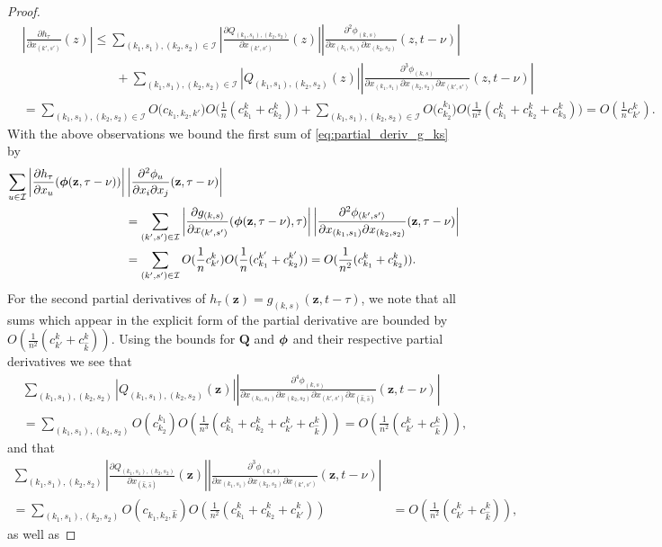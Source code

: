 \documentclass[acmsmall]{acmart}
\newcommand\bz{\mathbf{z}}
\newcommand\bphi{\text{\boldmath$\phi$}}
\newcommand\bQ{\mathbf{Q}}
\newcommand\calI{\mathcal{I}}
\newcommand\abs[1]{\left|#1\right|}         %
\newcommand{\dddd}[5]{ \frac{\partial^4 #1 }{ \partial x_{#2} \partial x_{#3} \partial x_{#4} \partial x_{#5} }}
\newcommand{\ddd}[4]{ \frac{\partial^3 #1 }{ \partial x_{#2} \partial x_{#3} \partial x_{#4} }}
\begin{document}
\begin{proof}
\begin{align*}
&\abs{\frac{\partial h_\tau}{\partial x_{(k',s')}}(z)} \leq \sum_{(k_1,s_1),(k_2,s_2) \in \calI} \abs{\frac{\partial Q_{(k_1,s_1),(k_2,s_2)}}{\partial x_{(k',s')}}(z)} \abs{\frac{\partial^2 \phi_{(k,s)}}{\partial x_{(k_1,s_1)} \partial x_{(k_2,s_2)}}(z,t-\nu)} \\
& \phantom{\frac{\partial h_\tau}{\partial x_{(k',s')}}(z) \leq} \quad + \sum_{(k_1,s_1),(k_2,s_2) \in \calI} \abs{Q_{(k_1,s_1),(k_2,s_2)}(z)} \abs{\frac{\partial^3 \phi_{(k,s)}}{\partial x_{(k_1,s_1)} \partial x_{(k_2,s_2)} \partial x_{(k',s')}}(z,t-\nu)} \\
& = \sum_{(k_1,s_1),(k_2,s_2) \in \calI} O\bigl(c_{k_1,k_2,k'}\bigr)O\bigl(\frac{1}{n}(c^k_{k_1}+c^k_{k_2})\bigr) + \sum_{(k_1,s_1),(k_2,s_2) \in \calI} O\bigl( c^{k_1}_{k_2} \bigr)O\bigl( \frac{1}{n^2} (c^{k}_{k_1} + c^{k}_{k_2} + c^{k}_{k_3})\bigr) 
= O(\frac1n c^{k}_{k'}).
\end{align*}
With the above observations we bound the first sum of \eqref{eq:partial_deriv_g_ks} by
\begin{align*}
\sum_{u \in \calI} \abs{\frac{\partial h_\tau}{\partial x_u}(\bphi (\bz, \tau-\nu))} & \abs{\frac{\partial^2 \phi_u}{\partial x_i \partial x_j}(\bz,\tau-\nu)} \\
& =\sum_{(k',s') \in \calI} \abs{\frac{\partial g_{(k,s)}}{\partial x_{(k',s')}}(\bphi (\bz, \tau-\nu), \tau)} \abs{\frac{\partial^2 \phi_{(k',s')}}{\partial x_{(k_1,s_1)} \partial x_{(k_2,s_2)}}(\bz,\tau-\nu)} \\
& = \sum_{(k',s')\in\calI} O(\frac1n c^k_{k'})O(\frac1n (c^{k'}_{k_1} + c^{k'}_{k_2})) = O(\frac{1}{n^2}(c^k_{k_1} + c^k_{k_2})).
\end{align*}
For the second partial derivatives of $h_\tau(\bz) = g_{(k,s)}(\bz,t-\tau)$, we note that all sums which appear in the explicit form of the partial derivative are bounded by $O(\frac{1}{n^2}(c^k_{k'} + c^k_{\hat{k}}))$. Using the bounds for $\bQ$ and $\bphi$ and their respective partial derivatives we see that
\begin{align*}
&\sum_{(k_1,s_1),(k_2,s_2)}  \abs{Q_{(k_1,s_1),(k_2,s_2)}(\bz)} \abs{\dddd{\phi_{(k,s)}}{(k_1,s_1)}{(k_2,s_2)}{(k',s')}{(\hat{k},\hat{s})}(\bz, t-\nu)} \\
&= \sum_{(k_1,s_1),(k_2,s_2)} O(c^{k_1}_{k_2})O(\frac{1}{n^3}( c^k_{k_1} + c^k_{k_2} + c^k_{k'} + c^k_{\hat{k}})) = O(\frac{1}{n^2}(c^k_{k'} + c^k_{\hat{k}})),
\end{align*}
and that
\begin{align*}
\sum_{(k_1,s_1),(k_2,s_2)}  \abs{\frac{\partial Q_{(k_1,s_1),(k_2,s_2)}}{\partial x_{(\hat{k},\hat{s})}}(\bz)} \abs{\ddd{\phi_{(k,s)}}{(k_1,s_1)}{(k_2,s_2)}{(k',s')}(\bz, t-\nu)}\\
= \sum_{(k_1,s_1),(k_2,s_2)} O(c_{k_1,k_2,\hat{k}})O(\frac{1}{n^2}( c^k_{k_1} + c^k_{k_2} + c^k_{k'}))
&= O(\frac{1}{n^2}(c^k_{k'} + c^k_{\hat{k}})),
\end{align*}
as well as 



\end{proof}
\end{document}
